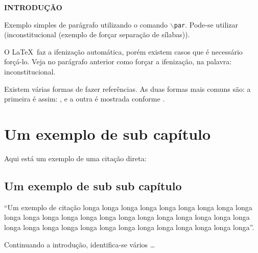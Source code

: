 \begin{center}
  \vspace{1.2em}
  \textbf{\large INTRODUÇÃO}
  \vspace{2.9em}
\end{center}
\thispagestyle{empty}


\par Exemplo simples de parágrafo utilizando o comando \texttt{$\backslash$par}. Pode-se utilizar (in\-cons\-titucional (exemplo de forçar separação de sílabas)).

\par O \LaTeX~faz a ifenização automática, porém existem casos que é necessário forçá-lo. Veja no parágrafo anterior como forçar a ifenização, na palavra: inconstitucional.

\par Existem várias formas de fazer referências. As duas formas mais comuns são: a primeira é assim: \cite{revista_patio_pedagoria_ar_livre}, e a outra é mostrada conforme \cite{ecocentro}.


\section{Um exemplo de sub capítulo}


\par Aqui está um exemplo de uma citação direta:

\subsection{Um exemplo de sub sub capítulo}

\begin{citacao}
``Um exemplo de citação longa longa longa longa longa longa longa longa longa longa longa longa longa longa longa longa longa longa longa longa longa longa longa longa longa longa longa longa longa longa longa longa longa longa longa''. \cite{gadotti2003boniteza}
\end{citacao}

\par Continuando a introdução, identifica-se vários \ldots